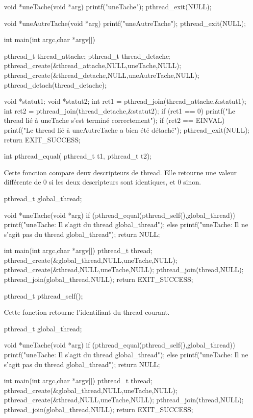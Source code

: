 \begin{codeblock}
void *uneTache(void *arg){
  printf("uneTache\n");
  pthread_exit(NULL);
}

void *uneAutreTache(void *arg) {
  printf("uneAutreTache\n");
  pthread_exit(NULL);
}

int main(int argc,char *argv[])
{
  pthread_t thread_attache;
  pthread_t thread_detache;
  pthread_create(&thread_attache,NULL,uneTache,NULL);
  pthread_create(&thread_detache,NULL,uneAutreTache,NULL);
  pthread_detach(thread_detache);

  void *statut1;
  void *statut2;
  int ret1 = pthread_join(thread_attache,&statut1);
  int ret2 = pthread_join(thread_detache,&statut2);
  if (ret1 == 0)
    printf("Le thread lié à uneTache s'est terminé correctement\n");
  if (ret2 == EINVAL)
    printf("Le thread lié à uneAutreTache a bien été détaché\n");
  pthread_exit(NULL);
  return EXIT_SUCCESS;
}
\end{codeblock}


\label{func:pthread_equal}

\begin{codeblock}
int pthread_equal(
    pthread_t t1,
    pthread_t t2);
\end{codeblock}
Cette fonction compare deux descripteurs de thread. Elle retourne une valeur différente de 0 si les deux descripteurs sont identiques, et 0 sinon.

\begin{codeblock}
pthread_t global_thread;

void *uneTache(void *arg) {
  if (pthread_equal(pthread_self(),global_thread))
    printf("uneTache: Il s'agit du thread global_thread\n");
  else
    printf("uneTache: Il ne s'agit pas du thread global_thread\n");
  return NULL;
}

int main(int argc,char *argv[])
{
  pthread_t thread;
  pthread_create(&global_thread,NULL,uneTache,NULL);
  pthread_create(&thread,NULL,uneTache,NULL);
  pthread_join(thread,NULL);
  pthread_join(global_thread,NULL);
  return EXIT_SUCCESS;
}
\end{codeblock}

\label{func:pthread_self}

\begin{codeblock}
pthread_t pthread_self();
\end{codeblock}
Cette fonction retourne l'identifiant du thread courant.
\begin{codeblock}
pthread_t global_thread;

void *uneTache(void *arg) {
  if (pthread_equal(pthread_self(),global_thread))
    printf("uneTache: Il s'agit du thread global_thread\n");
  else
    printf("uneTache: Il ne s'agit pas du thread global_thread\n");
  return NULL;
}

int main(int argc,char *argv[])
{
  pthread_t thread;
  pthread_create(&global_thread,NULL,uneTache,NULL);
  pthread_create(&thread,NULL,uneTache,NULL);
  pthread_join(thread,NULL);
  pthread_join(global_thread,NULL);
  return EXIT_SUCCESS;
}
\end{codeblock}


